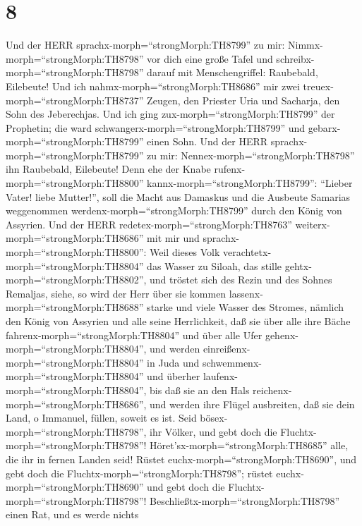\hypertarget{section-7}{%
\section{8}\label{section-7}}

 Und der HERR sprachx-morph=``strongMorph:TH8799'' zu mir:
Nimmx-morph=``strongMorph:TH8798'' vor dich eine große Tafel und
schreibx-morph=``strongMorph:TH8798'' darauf mit Menschengriffel:
Raubebald, Eilebeute!  Und ich
nahmx-morph=``strongMorph:TH8686'' mir zwei
treuex-morph=``strongMorph:TH8737'' Zeugen, den Priester Uria und
Sacharja, den Sohn des Jeberechjas.  Und ich ging
zux-morph=``strongMorph:TH8799'' der Prophetin; die ward
schwangerx-morph=``strongMorph:TH8799'' und
gebarx-morph=``strongMorph:TH8799'' einen Sohn. Und der HERR
sprachx-morph=``strongMorph:TH8799'' zu mir:
Nennex-morph=``strongMorph:TH8798'' ihn Raubebald, Eilebeute!
 Denn ehe der Knabe rufenx-morph=``strongMorph:TH8800''
kannx-morph=``strongMorph:TH8799'': ``Lieber Vater! liebe Mutter!'',
soll die Macht aus Damaskus und die Ausbeute Samarias weggenommen
werdenx-morph=``strongMorph:TH8799'' durch den König von Assyrien.
 Und der HERR redetex-morph=``strongMorph:TH8763''
weiterx-morph=``strongMorph:TH8686'' mit mir und
sprachx-morph=``strongMorph:TH8800'':  Weil dieses Volk
verachtetx-morph=``strongMorph:TH8804'' das Wasser zu Siloah, das stille
gehtx-morph=``strongMorph:TH8802'', und tröstet sich des Rezin und des
Sohnes Remaljas,  siehe, so wird der Herr über sie kommen
lassenx-morph=``strongMorph:TH8688'' starke und viele Wasser des
Stromes, nämlich den König von Assyrien und alle seine Herrlichkeit, daß
sie über alle ihre Bäche fahrenx-morph=``strongMorph:TH8804'' und über
alle Ufer gehenx-morph=``strongMorph:TH8804'',  und werden
einreißenx-morph=``strongMorph:TH8804'' in Juda und
schwemmenx-morph=``strongMorph:TH8804'' und überher
laufenx-morph=``strongMorph:TH8804'', bis daß sie an den Hals
reichenx-morph=``strongMorph:TH8686'', und werden ihre Flügel
ausbreiten, daß sie dein Land, o Immanuel, füllen, soweit es ist.
 Seid bösex-morph=``strongMorph:TH8798'', ihr Völker, und
gebt doch die Fluchtx-morph=``strongMorph:TH8798''!
Höret'sx-morph=``strongMorph:TH8685'' alle, die ihr in fernen Landen
seid! Rüstet euchx-morph=``strongMorph:TH8690'', und gebt doch die
Fluchtx-morph=``strongMorph:TH8798''; rüstet
euchx-morph=``strongMorph:TH8690'' und gebt doch die
Fluchtx-morph=``strongMorph:TH8798''! 
Beschließtx-morph=``strongMorph:TH8798'' einen Rat, und es werde nichts
